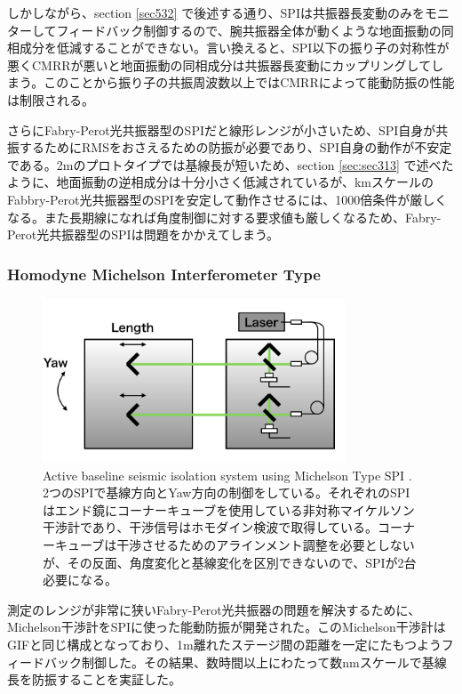 しかしながら、section \cref{sec532} で後述する通り、SPIは共振器長変動のみをモニターしてフィードバック制御するので、腕共振器全体が動くような地面振動の同相成分を低減することができない。言い換えると、SPI以下の振り子の対称性が悪くCMRRが悪いと地面振動の同相成分は共振器長変動にカップリングしてしまう。このことから振り子の共振周波数以上ではCMRRによって能動防振の性能は制限される。

さらにFabry-Perot光共振器型のSPIだと線形レンジが小さいため、SPI自身が共振するためにRMSをおさえるための防振が必要であり、SPI自身の動作が不安定である。2mのプロトタイプでは基線長が短いため、section \cref{sec:sec313} で述べたように、地面振動の逆相成分は十分小さく低減されているが、kmスケールのFabbry-Perot光共振器型のSPIを安定して動作させるには、1000倍条件が厳しくなる。また長期線になれば角度制御に対する要求値も厳しくなるため、Fabry-Perot光共振器型のSPIは問題をかかえてしまう。

\subsubsection{Homodyne Michelson Interferometer Type}
\begin{figure}[h]
  \begin{center}   
    \includegraphics[width=9cm]{./img_chap5/img508a.png}
    \caption{Active baseline seismic isolation system using Michelson Type SPI \cite{Numata2008interferometric}. 2つのSPIで基線方向とYaw方向の制御をしている。それぞれのSPIはエンド鏡にコーナーキューブを使用している非対称マイケルソン干渉計であり、干渉信号はホモダイン検波で取得している\cite{araya2002iodine}。コーナーキューブは干渉させるためのアラインメント調整を必要としないが、その反面、角度変化と基線変化を区別できないので、SPIが2台必要になる。} \label{img:img508a}
  \end{center}
\end{figure}
測定のレンジが非常に狭いFabry-Perot光共振器の問題を解決するために、Michelson干渉計をSPIに使った能動防振が開発された\cite{Numata2008interferometric}。このMichelson干渉計はGIFと同じ構成となっており、1m離れたステージ間の距離を一定にたもつようフィードバック制御した。その結果、数時間以上にわたって数nmスケールで基線長を防振することを実証した。

